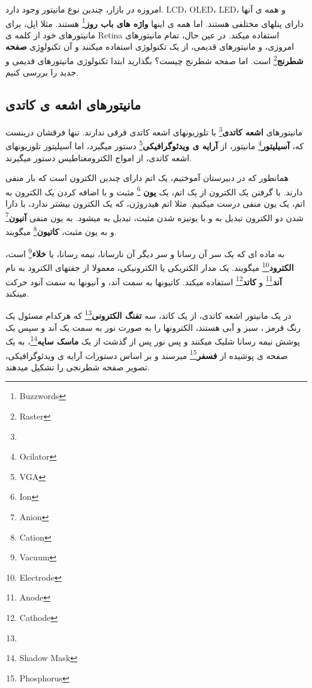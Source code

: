 \documentclass[14pt,a4paper]{memoir}
\begin{document}
امروزه در بازار، چندین نوع مانیتور وجود دارد. LCD، OLED، LED، و همه ی آنها دارای پنلهای مختلفی هستند. اما همه ی اینها \textbf{واژه های باب روز}\footnote{Buzzwords} هستند. مثلا اپل، برای مانیتورهای خود از کلمه ی Retina استفاده میکند. در عین حال، تمام مانیتورهای امروزی، و مانیتورهای قدیمی، از یک تکنولوژی استفاده میکنند و آن تکنولوِژی \textbf{صفحه شطرنج}\footnote{Raster} است. اما صفحه شطرنج چیست؟ بگذارید ابتدا تکنولوژی مانیتورهای قدیمی و جدید را بررسی کنیم.

\subsection{مانیتورهای اشعه ی کاتدی}\label{crt}
مانیتورهای \textbf{اشعه کاتدی}\footnote{} با تلوزیونهای اشعه کاتدی فرقی ندارند. تنها فرقشان درینست که، \textbf{آسیلیتور}\footnote{Ocilator} مانیتور، از \textbf{آرایه ی ویدئوگرافیکی}\footnote{VGA} دستور میگیرد، اما آسیلیتور تلوزیونهای اشعه کاتدی، از امواج الکترومغناطیس دستور میگیرند. 

همانطور که در دبیرستان آموختیم، یک اتم دارای چندین الکترون است که بار منفی دارند. با گرفتن یک الکترون از یک اتم، یک \textbf{یون }\footnote{Ion} مثبت و با اضافه کردن یک الکترون به اتم، یک یون منفی درست میکنیم. مثلا  اتم هیدروژن، که یک الکترون بیشتر ندارد، با دارا شدن دو الکترون تبدیل به  و با یونیزه شدن مثبت، تبدیل به  میشود. به یون منفی \textbf{آنیون}\footnote{Anion} و به یون مثبت، \textbf{کاتیون}\footnote{Cation} میگویند.

به ماده ای که یک سر آن رسانا و سر دیگر آن نارسانا، نیمه رسانا، یا \textbf{خلاء}\footnote{Vacuum} است، \textbf{الکترود}\footnote{Electrode} میگویند. یک مدار الکتریکی یا الکترونیکی، معمولا از جفتهای الکترود به نام \textbf{آند}\footnote{Anode} و \textbf{کاتد}\footnote{Cathode} استفاده میکند. کاتیونها به سمت آند، و آنیونها به سمت آنود حرکت مینکند.
	 
	 در یک مانیتور اشعه کاتدی، از یک کاتد، سه \textbf{تفنگ الکترونی}\footnote{} که هرکدام مسئول یک رنگ قرمز ، سبز و آبی هستند، الکترونها را به صورت نور به سمت یک آند و سپس یک پوشش نیمه رسانا شلیک میکنند و پس نور پس از گذشت از یک \textbf{ماسک سایه}\footnote{Shadow Mask}، به یک صفحه ی پوشیده از \textbf{فسفر}\footnote{Phosphorus}  میرسند و بر اساس دستورات آرایه ی ویدئوگرافیکی، تصویر صفحه شطرنجی را تشکیل میدهند.
	 
	 
	 
\end{document}
